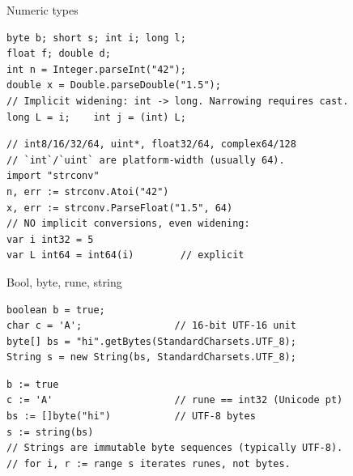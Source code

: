 \documentclass[10pt]{article}
\begin{document}
\begin{construct}{Numeric types}
\noindent
\begin{minipage}[t]{0.485\linewidth}
\begin{lstlisting}[style=java, title=Java]
byte b; short s; int i; long l;
float f; double d;
int n = Integer.parseInt("42");
double x = Double.parseDouble("1.5");
// Implicit widening: int -> long. Narrowing requires cast.
long L = i;    int j = (int) L;
\end{lstlisting}
\end{minipage}\hfill
\begin{minipage}[t]{0.485\linewidth}
\begin{lstlisting}[style=go, title=Go]
// int8/16/32/64, uint*, float32/64, complex64/128
// `int`/`uint` are platform-width (usually 64).
import "strconv"
n, err := strconv.Atoi("42")
x, err := strconv.ParseFloat("1.5", 64)
// NO implicit conversions, even widening:
var i int32 = 5
var L int64 = int64(i)        // explicit
\end{lstlisting}
\end{minipage}
\end{construct}

\begin{construct}{Bool, byte, rune, string}
\noindent
\begin{minipage}[t]{0.485\linewidth}
\begin{lstlisting}[style=java, title=Java]
boolean b = true;
char c = 'A';                // 16-bit UTF-16 unit
byte[] bs = "hi".getBytes(StandardCharsets.UTF_8);
String s = new String(bs, StandardCharsets.UTF_8);
\end{lstlisting}
\end{minipage}\hfill
\begin{minipage}[t]{0.485\linewidth}
\begin{lstlisting}[style=go, title=Go]
b := true
c := 'A'                     // rune == int32 (Unicode pt)
bs := []byte("hi")           // UTF-8 bytes
s := string(bs)
// Strings are immutable byte sequences (typically UTF-8).
// for i, r := range s iterates runes, not bytes.
\end{lstlisting}
\end{minipage}
\end{construct}

\end{document}
